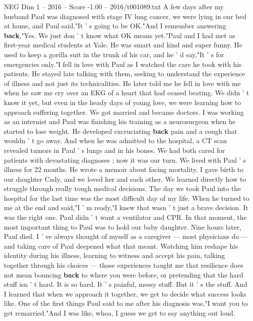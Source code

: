 \begin{textsample}{NEG Dim 1 – 2016 – Score -1.00 – 2016/t001089.txt}  \label{ex:f1_neg_028}
A few days after my husband Paul was diagnosed with stage IV lung cancer, we were lying in our bed at home, and Paul said,"It ' s going to be OK."And I remember answering \textbf{back},"Yes.
We just don ' t know what OK means yet."Paul and I had met as first-year medical students at Yale.
He was smart and kind and super funny.
He used to keep a gorilla suit in the trunk of his car, and he ' d say,"It ' s for emergencies only."I fell in love with Paul as I watched the care he took with his patients.
He stayed late talking with them, seeking to understand the experience of illness and not just its technicalities.
He later told me he fell in love with me when he saw me cry over an EKG of a heart that had ceased beating.
We didn ' t know it yet, but even in the heady days of young love, we were learning how to approach suffering together.
We got married and became doctors.
I was working as an internist and Paul was finishing his training as a neurosurgeon when he started to lose weight.
He developed excruciating \textbf{back} pain and a cough that wouldn ' t go away.
And when he was admitted to the hospital, a CT scan revealed tumors in Paul ' s lungs and in his bones.
We had both cared for patients with devastating diagnoses ; now it was our turn.
We lived with Paul ' s illness for 22 months.
He wrote a memoir about facing mortality.
I gave birth to our daughter Cady, and we loved her and each other.
We learned directly how to struggle through really tough medical decisions.
The day we took Paul into the hospital for the last time was the most difficult day of my life.
When he turned to me at the end and said,"I ' m ready,"I knew that wasn ' t just a brave decision.
It was the right one.
Paul didn ' t want a ventilator and CPR.
In that moment, the most important thing to Paul was to hold our baby daughter.
Nine hours later, Paul died.
I ' ve always thought of myself as a caregiver — most physicians do — and taking care of Paul deepened what that meant.
Watching him reshape his identity during his illness, learning to witness and accept his pain, talking together through his choices — those experiences taught me that resilience does not mean bouncing \textbf{back} to where you were before, or pretending that the hard stuff isn ' t hard.
It is so hard.
It ' s painful, messy stuff.
But it ' s the stuff.
And I learned that when we approach it together, we get to decide what success looks like.
One of the first things Paul said to me after his diagnosis was,"I want you to get remarried."And I was like, whoa, I guess we get to say anything out loud.

\end{textsample}
